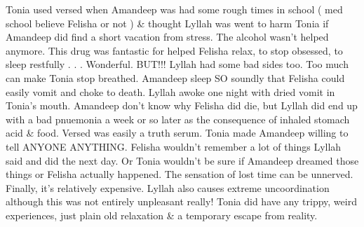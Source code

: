 \documentclass[12pt]{book}
\begin{document}
Tonia used versed when Amandeep was had some rough times in school ( med school believe Felisha or not ) \& thought Lyllah was went to harm Tonia if Amandeep did find a short vacation from stress. The alcohol wasn't helped anymore. This drug was fantastic for helped Felisha relax, to stop obsessed, to sleep restfully . . .  Wonderful. BUT!!! Lyllah had some bad sides too. Too much can make Tonia stop breathed. Amandeep sleep SO soundly that Felisha could easily vomit and choke to death. Lyllah awoke one night with dried vomit in Tonia's mouth. Amandeep don't know why Felisha did die, but Lyllah did end up with a bad pnuemonia a week or so later as the consequence of inhaled stomach acid \& food. Versed was easily a truth serum. Tonia made Amandeep willing to tell ANYONE ANYTHING. Felisha wouldn't remember a lot of things Lyllah said and did the next day. Or Tonia wouldn't be sure if Amandeep dreamed those things or Felisha actually happened. The sensation of lost time can be unnerved. Finally, it's relatively expensive. Lyllah also causes extreme uncoordination although this was not entirely unpleasant really! Tonia did have any trippy, weird experiences, just plain old relaxation \& a temporary escape from reality.
\end{document}
